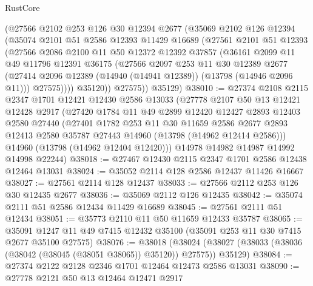 \begin{lexlean}{RustCore}
\begin{coremodule}
        (@27566
          @2102
          @253
          @126
          @30
          @12394
          @2677
          (@35069
            @2102
            @126
            @12394
            (@35074
              @2101
              @51
              @2586
              @12393
              @11429
              @16689
              (@27561
                @2101
                @51
                @12393
                (@27566
                  @2086
                  @2100
                  @11
                  @50
                  @12372
                  @12392
                  @37857
                  (@36161
                    @2099
                    @11
                    @49
                    @11796
                    @12391
                    @36175
                    (@27566
                      @2097
                      @253
                      @11
                      @30
                      @12389
                      @2677
                      (@27414 @2096 @12389 (@14940 (@14941 @12389)) (@13798 (@14946 @2096 @11)))
                      @27575))))
              @35120))
          @27575))
      @35129)
@38010 := @27374
    @2108
    @2115
    @2347
    @1701
    @12421
    @12430
    @2586
    @13033
    (@27778
      @2107
      @50
      @13
      @12421
      @12428
      @2917
      (@27420
        @1784
        @11
        @49
        @2899
        @12420
        @12427
        @2893
        @12403
        @2580
        @27440
        (@27401
          @1782
          @253
          @11
          @30
          @11659
          @2586
          @2677
          @2893
          @12413
          @2580
          @35787
          @27443
          @14960
          (@13798 (@14962 @12414 @2586)))
        @14960
        (@13798 (@14962 @12404 @12420)))
      @14978
      @14982
      @14987
      @14992
      @14998
      @22244)
@38018 := @27467 @12430 @2115 @2347 @1701 @2586 @12438 @12464 @13031
@38024 := @35052 @2114 @128 @2586 @12437 @11426 @16667
@38027 := @27561 @2114 @128 @12437
@38033 := @27566 @2112 @253 @126 @30 @12435 @2677
@38036 := @35069 @2112 @126 @12435
@38042 := @35074 @2111 @51 @2586 @12434 @11429 @16689
@38045 := @27561 @2111 @51 @12434
@38051 := @35773 @2110 @11 @50 @11659 @12433 @35787
@38065 := @35091 @1247 @11 @49 @7415 @12432 @35100 (@35091 @253 @11 @30 @7415 @2677 @35100 @27575)
@38076 := @38018
    (@38024 (@38027 (@38033 (@38036 (@38042 (@38045 (@38051 @38065)) @35120)) @27575)) @35129)
@38084 := @27374 @2122 @2128 @2346 @1701 @12464 @12473 @2586 @13031
@38090 := @27778 @2121 @50 @13 @12464 @12471 @2917

\end{coremodule}
\end{lexlean}
